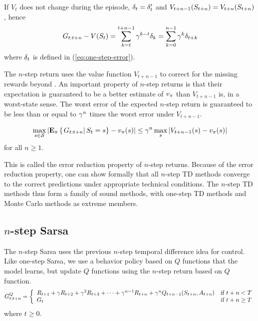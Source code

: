 If $V_t$ does not change during the episode, $\delta_{t} = \delta'_{t}$ and $V_{t+n-1}(S_{t+n}) = V_{t+n}(S_{t+n})$,
hence
\begin{equation}
G_{{t}:{t+n}} - V(S_{t})
= \sum_{k=t}^{t+n-1} \gamma^{k-t}\delta_{k}
= \sum_{k=0}^{n-1} \gamma^{k}\delta_{t+k}
\end{equation}
where $\delta_{t}$ is defined in (\ref{eq:one-step-error}).

The $n$-step return uses the value function $V_{t + n-1}$
to correct for the missing rewards beyond .
An important property of $n$-step returns is
that their expectation is guaranteed to be a better estimate of $v_{\pi}$ than $V_{t+n-1}$ is,
in a worst-state sense.
The worst error of the expected $n$-step return
is guaranteed to be less than or equal to $\gamma^n$ times the worst error under $V_{t + n - 1}$.

\begin{equation}
\max_{s \in \mathcal{S}} \left| \mathbf{E}_{\pi} \left\{\left.G_{{t}:{t+n}}\right|S_{t}=s\right\} - v_{\pi}(s) \right|
\leq
\gamma^n
\max_s \left| V_{t+n-1}(s) - v_{\pi}(s) \right|
\end{equation}
for all $n\geq1$.

This is called the error reduction property of $n$-step returns.
Because of the error reduction property,
one can show formally that all $n$-step TD methods converge to the correct predictions under appropriate technical conditions.
The $n$-step TD methods thus form a family of sound methods,
with one-step TD methods and Monte Carlo methods as extreme members. 





\subsection{$n$-step Sarsa}

The $n$-step Sarsa uses the previous $n$-step temporal difference idea for control.
Like one-step Sarsa, we use a behavior policy based on $Q$ functions that the model learns,
but update $Q$ functions using the $n$-step return based on $Q$ function.
\begin{equation}
G^{Q}_{{t}:{t+n}} = \left\{\begin{array}{ll}
R_{t+1} + \gamma R_{t+2} + \gamma^2 R_{t+3} + \cdots + \gamma^{n-1} R_{t+n} + \gamma^n Q_{t+n-1}(S_{t+n}, A_{t+n})
&\mbox{if } t+n < T
\\
G_{{t}} & \mbox{if } t+n \geq T
\end{array}\right.
\end{equation}
where $t\geq0$.

